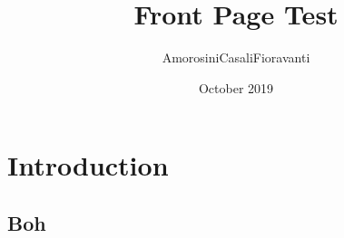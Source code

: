 \documentclass{report}
\title{Front Page Test}
\author{AmorosiniCasaliFioravanti}
\date{October 2019}
\begin{document}
\maketitle 
\tableofcontents
\chapter{Introduction}
\lipsum[2-3]
\section{Boh}
\lipsum[4-5]
\end{document}
